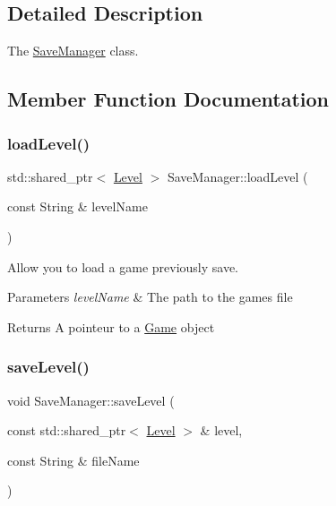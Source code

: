 \subsection{Detailed Description}
The \hyperlink{classSaveManager}{Save\+Manager} class. 

\subsection{Member Function Documentation}
\mbox{\label{classSaveManager_aa0661d6a8f9c0330755a8e03f8631992}} 
\subsubsection{\texorpdfstring{load\+Level()}{loadLevel()}}
{\footnotesize\ttfamily std\+::shared\+\_\+ptr$<$ \hyperlink{classLevel}{Level} $>$ Save\+Manager\+::load\+Level (\begin{DoxyParamCaption}\item[{const String \&}]{level\+Name }\end{DoxyParamCaption})}



Allow you to load a game previously save. 


\begin{DoxyParams}{Parameters}
{\em level\+Name} & The path to the game\textquotesingle{}s file \\
\hline
\end{DoxyParams}
\begin{DoxyReturn}{Returns}
A pointeur to a \hyperlink{classGame}{Game} object 
\end{DoxyReturn}
\mbox{\label{classSaveManager_a3fd6a2e996ee848bfec385a288f44461}} 
\subsubsection{\texorpdfstring{save\+Level()}{saveLevel()}}
{\footnotesize\ttfamily void Save\+Manager\+::save\+Level (\begin{DoxyParamCaption}\item[{const std\+::shared\+\_\+ptr$<$ \hyperlink{classLevel}{Level} $>$ \&}]{level,  }\item[{const String \&}]{file\+Name }\end{DoxyParamCaption})}



